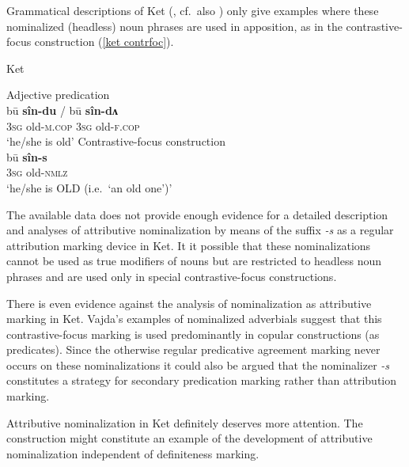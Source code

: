 Grammatical descriptions of Ket (\citealt{vajda2004}, cf.~also \citealt{krukova2007}) only give examples where these nominalized (headless) noun phrases are used in apposition, as in the contrastive-focus construction (\ref{ket contrfoc}). 
\begin{exe}
\ex 
\label{ket contrfoc}
\rm{Ket \citep{vajda2005}} 
\begin{xlist}
\ex	
\rm{Adjective predication}\\
\gll	bū \textbf{sîn-du} / bū \textbf{sîn-dʌ}\\
	3\textsc{sg} old-\textsc{m.cop} { } 3\textsc{sg} old-\textsc{f.cop}\\
\glt	‘he/she is old’
\ex	
\rm{Contrastive-focus construction}\\
\gll	bū \textbf{sîn-s}\\
	3\textsc{sg} old-\textsc{nmlz}\\
\glt	‘he/she is OLD (i.e.~‘an old one’)’
\end{xlist}
\end{exe}
The available data does not provide enough evidence for a detailed description and analyses of attributive nominalization by means of the suffix \textit{-s} as a regular attribution marking device in Ket. It it possible that these nominalizations cannot be used as true modifiers of nouns but are restricted to headless noun phrases and are used only in special contrastive-focus constructions.

There is even evidence against the analysis of nominalization as attributive marking in Ket. Vajda's examples of nominalized adverbials suggest that this contrastive-focus marking is used predominantly in copular constructions (as predicates). Since the otherwise regular predicative agreement marking never occurs on these nominalizations \cite[15]{vajda2004} it could also be argued that the nominalizer \textit{-s} constitutes a strategy for secondary predication marking rather than attribution marking.

Attributive nominalization in Ket definitely deserves more attention. The construction might constitute an example of the development of attributive nominalization independent of definiteness marking.


